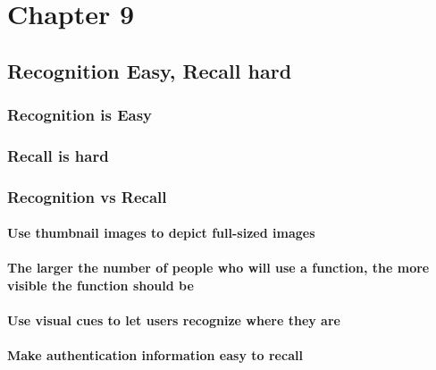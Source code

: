 \documentclass[11pt,]{article}
\let\oldparagraph\paragraph
\renewcommand{\paragraph}[1]{\oldparagraph{#1}\mbox{}}
\begin{document}
\hypertarget{chapter-9}{%
\section{Chapter 9}\label{chapter-9}}

\hypertarget{recognition-easy-recall-hard}{%
\subsection{Recognition Easy, Recall
hard}\label{recognition-easy-recall-hard}}

\hypertarget{recognition-is-easy}{%
\subsubsection{Recognition is Easy}\label{recognition-is-easy}}

\hypertarget{recall-is-hard}{%
\subsubsection{Recall is hard}\label{recall-is-hard}}

\hypertarget{recognition-vs-recall}{%
\subsubsection{Recognition vs Recall}\label{recognition-vs-recall}}

\hypertarget{use-thumbnail-images-to-depict-full-sized-images}{%
\paragraph{Use thumbnail images to depict full-sized
images}\label{use-thumbnail-images-to-depict-full-sized-images}}

\hypertarget{the-larger-the-number-of-people-who-will-use-a-function-the-more-visible-the-function-should-be}{%
\paragraph{The larger the number of people who will use a function, the
more visible the function should
be}\label{the-larger-the-number-of-people-who-will-use-a-function-the-more-visible-the-function-should-be}}

\hypertarget{use-visual-cues-to-let-users-recognize-where-they-are}{%
\paragraph{Use visual cues to let users recognize where they
are}\label{use-visual-cues-to-let-users-recognize-where-they-are}}

\hypertarget{make-authentication-information-easy-to-recall}{%
\paragraph{Make authentication information easy to
recall}\label{make-authentication-information-easy-to-recall}}
\end{document}
